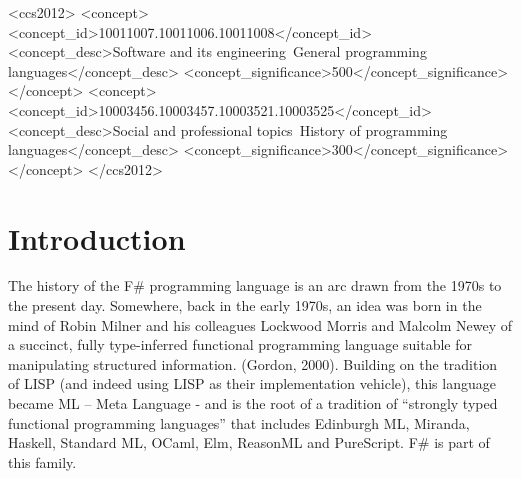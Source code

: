 \documentclass[acmsmall]{acmart}\settopmatter{}
\begin{document}
\begin{CCSXML}
<ccs2012>
<concept>
<concept_id>10011007.10011006.10011008</concept_id>
<concept_desc>Software and its engineering~General programming languages</concept_desc>
<concept_significance>500</concept_significance>
</concept>
<concept>
<concept_id>10003456.10003457.10003521.10003525</concept_id>
<concept_desc>Social and professional topics~History of programming languages</concept_desc>
<concept_significance>300</concept_significance>
</concept>
</ccs2012>
\end{CCSXML}





\maketitle


\section*{Introduction}

The history of the F\# programming language is an arc drawn from the 1970s to the present day.  Somewhere, back in
the early 1970s, an idea was born in the mind of Robin Milner and his colleagues Lockwood Morris and Malcolm Newey of a
succinct, fully type-inferred functional programming language suitable for manipulating structured information. (Gordon, 2000).  Building
on the tradition of LISP (and indeed using LISP as their implementation vehicle), this language became ML – Meta Language - and
is the root of a tradition of “strongly typed functional programming languages” that includes Edinburgh ML, Miranda, Haskell,
Standard ML, OCaml, Elm, ReasonML and PureScript. F\# is part of this family.
\end{document}
